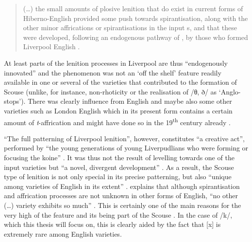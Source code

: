 	\begin{quote}
		(\ldots) the small amounts of plosive lenition that do exist in current forms of Hiberno-English provided some push towards spirantisation, along with the other minor affrications or spirantisations in the input s, and that these were developed, following an endogenous pathway of , by those who formed Liverpool English \citeyearpar[131]{honeybone2007}.
	\end{quote}

At least parts of the lenition processes in Liverpool are thus ``endogenously innovated'' \citep[130]{honeybone2007} and the phenomenon was not an `off the shelf' feature readily available in one or several of the varieties that contributed to the formation of Scouse (unlike, for instance, non-rhoticity or the realisation of /θ, ð/ as `Anglo- stops').
There was clearly influence from  English and maybe also some other varieties such as London English which in its present form contains a certain amount of \emph{t}-affrication and might have done so in the 19\textsuperscript{th} century already \parencite[cf.][132]{honeybone2007}.

``The full patterning of Liverpool lenition'', however, constitutes ``a creative act'', performed by ``the young generations of young Liverpudlians who were forming or focusing the koine'' \parencite[132]{honeybone2007}.
It was thus not the result of levelling towards one of the input varieties but ``a novel, divergent development'' \parencite[132]{honeybone2007}.
As a result, the Scouse type of lenition is not only special in its precise patterning, but also ``unique among varieties of English in its extent'' \parencite[132]{honeybone2007}.
\textcite[130]{honeybone2007} explains that although spirantisation and affrication processes are not unknown in other forms of English, ``no other (\ldots) variety exhibits so much'' \parencite[130]{honeybone2007}.
This is certainly one of the main reasons for the very high  of the feature and its being part of the Scouse .
In the case of /k/, which this thesis will focus on, this is clearly aided by the fact that [x] is extremely rare among English varieties.

